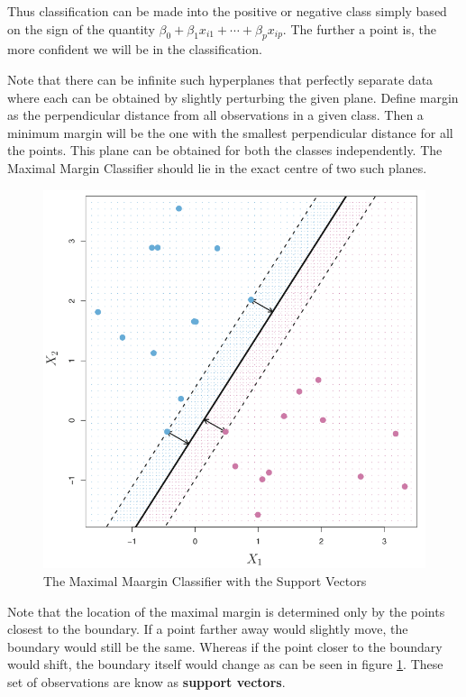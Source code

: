 \documentclass[11pt, a4paper]{article}
\begin{document}
    Thus classification can be made into the positive or negative class simply based on the sign of the quantity $\beta_{0} + \beta_{1}x_{i1} + \cdots + \beta_{p}x_{ip}$. The further a point is, the more confident we will be in the classification.\newline

    Note that there can be infinite such hyperplanes that perfectly separate data where each can be obtained by slightly perturbing the given plane. Define margin as the perpendicular distance from all observations in a given class. Then a minimum margin will be the one with the smallest perpendicular distance for all the points. This plane can be obtained for both the classes independently. The Maximal Margin Classifier should lie in the exact centre of two such planes.\newline

    \begin{figure}[h]
    \includegraphics[scale=0.6]{mmc}
    \centering
    \caption{The Maximal Maargin Classifier with the Support Vectors}
    \label{fig:mmc} %
    \end{figure}

    Note that the location of the maximal margin is determined only by the points closest to the boundary. If a point farther away would slightly move, the boundary would still be the same. Whereas if the point closer to the boundary would shift, the boundary itself would change as can be seen in figure \ref{fig:mmc}. These set of observations are know as \textbf{support vectors}.
\end{document}
